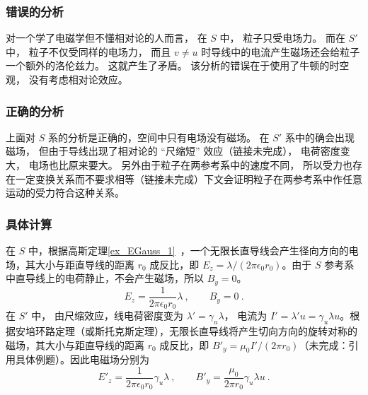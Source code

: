 \subsubsection{错误的分析}
对一个学了电磁学但不懂相对论的人而言， 在 $S$ 中， 粒子只受电场力。 而在 $S'$ 中， 粒子不仅受同样的电场力， 而且 $v \ne u$ 时导线中的电流产生磁场还会给粒子一个额外的洛伦兹力。 这就产生了矛盾。 该分析的错误在于使用了牛顿的时空观， 没有考虑相对论效应。

\subsubsection{正确的分析}
上面对 $S$ 系的分析是正确的，空间中只有电场没有磁场。 在 $S'$ 系中的确会出现磁场， 但由于导线出现了相对论的 “尺缩短” 效应（链接未完成）， 电荷密度变大， 电场也比原来要大。 另外由于粒子在两参考系中的速度不同， 所以受力也存在一定变换关系而不要求相等（链接未完成）下文会证明粒子在两参考系中作任意运动的受力符合这种关系。

\subsubsection{具体计算}
在 $S$ 中，根据高斯定理\autoref{ex_EGauss_1}~，一个无限长直导线会产生径向方向的电场，其大小与距直导线的距离 $r_0$ 成反比，即 $E_z=\lambda/(2\pi\epsilon_0r_0)$。由于 $S$ 参考系中直导线上的电荷静止，不会产生磁场，所以 $B_y=0$。
\begin{equation}
E_{z} = \frac{1}{2\pi\epsilon_0 r_0} \lambda~,
\qquad
B_{y} = 0~.
\end{equation}
在 $S'$ 中， 由尺缩效应，线电荷密度变为 $\lambda' = \gamma_u \lambda$， 电流为 $I' = \lambda' u = \gamma_u \lambda u$。根据安培环路定理（或斯托克斯定理），无限长直导线将产生切向方向的旋转对称的磁场，其大小与距直导线的距离 $r_0$ 成反比，即 $B'_y=\mu_0 I' /(2\pi r_0)$（未完成：引用具体例题）。因此电磁场分别为
\begin{equation}
E'_z = \frac{1}{2\pi\epsilon_0 r_0} \gamma_u \lambda~,
\qquad
B'_y = \frac{\mu_0}{2\pi r_0}\gamma_u \lambda u~.
\end{equation}

